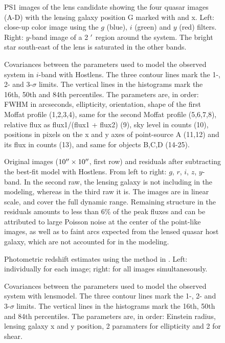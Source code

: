 \documentclass[manuscript]{aastex}
\begin{document}
\begin{figure}
\caption{
PS1 images of the lens candidate showing the four quasar images (A-D) with the lensing galaxy position G marked with and x. Left: close-up color image using the $g$ (blue), $i$ (green) and $y$ (red) filters. Right: $y$-band image of a 2 $\mbox{$^\prime$}$ region around the system. The bright star south-east of the lens is saturated in the other bands.}
\label{lens}
\end{figure}


\begin{figure}
\caption{
Covariances between the parameters used to model the observed system in $i$-band with Hostlens. The three contour lines mark the 1-, 2- and 3-$\sigma$ limits. The vertical lines in the histograms mark the 16th, 50th and 84th percentiles. The parameters are, in order: FWHM in arcseconds, ellipticity, orientation, shape of the first Moffat profile (1,2,3,4), same for the second Moffat profile (5,6,7,8), relative flux as flux1/(flux1 + flux2) (9), sky level in counts (10), positions in pixels on the x and y axes of point-source A (11,12) and its flux in counts (13), and same for objects B,C,D (14-25).}
\label{mcmc_hostlens}
\end{figure}


\begin{figure}
\caption{
Original images ($10\mbox{$^{\prime\prime}$}\times10\mbox{$^{\prime\prime}$}$, first row) and residuals after subtracting the best-fit model with Hostlens. From left to right: $g$, $r$, $i$, $z$, $y$-band. In the second raw, the lensing galaxy is not including in the modeling, whereas in the third raw it is. The images are in linear scale, and cover the full dynamic range. Remaining structure in the residuals amounts to less than 6\% of the peak fluxes and can be attributed to large Poisson noise at the center of the point-like images, as well as to faint arcs expected from the lensed quasar host galaxy, which are not accounted for in the modeling.}
\label{hostlens}
\end{figure}


\begin{figure}
\caption{
Photometric redshift estimates using the method in \citet{wu10}. 
Left: individually for each image; right: for all images simultanesously.}
\label{redshift}
\end{figure}


\begin{figure}
\caption{
Covariances between the parameters used to model the observed system with lensmodel. The three contour lines mark the 1-, 2- and 3-$\sigma$ limits. The vertical lines in the histograms mark the 16th, 50th and 84th percentiles. The parameters are, in order: Einstein radius, lensing galaxy x and y position, 2 paramaters for ellipticity and 2 for shear.}
\label{mcmc_gravlens}
\end{figure}
\end{document}
